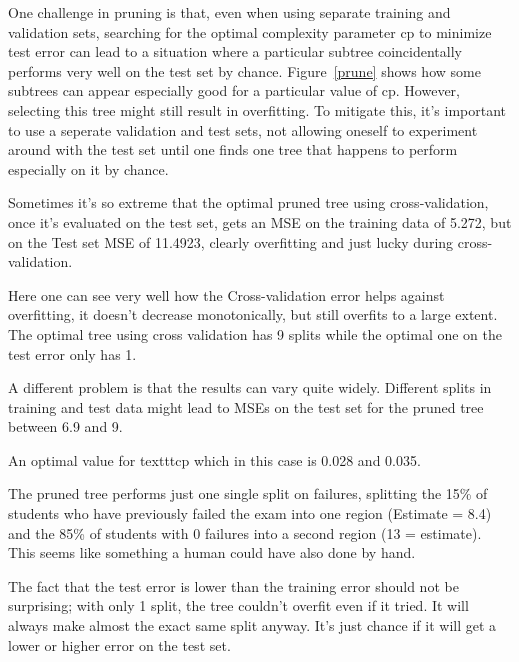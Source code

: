 \documentclass[12pt]{article}
\begin{document}
One challenge in pruning is that, even when using separate training and validation sets, searching for the optimal complexity parameter \( \text{cp} \) to minimize test error can lead to a situation where a particular subtree coincidentally performs very well on the test set by chance. Figure~\ref{prune} shows how some subtrees can appear especially good for a particular value of \( \text{cp} \). However, selecting this tree might still result in overfitting. To mitigate this, it's important to use a seperate validation and test sets, not allowing oneself to experiment around with the test set until one finds one tree that happens to perform especially on it by chance.






Sometimes it's so extreme that the optimal pruned tree using cross-validation, once it's evaluated on the test set, gets an MSE on the training data of 5.272, but on the Test set MSE of 11.4923, clearly overfitting and just lucky during cross-validation.

Here one can see very well how the Cross-validation error helps against overfitting, it doesn't decrease monotonically, but still overfits to a large extent. The optimal tree using cross validation has 9 splits while the optimal one on the test error only has 1.


A different problem is that the results can vary quite widely. Different splits in training and test data might lead to MSEs on the test set for the pruned tree between 6.9 and 9.

An optimal value for texttt{cp} which in this case is 0.028 and 0.035.







The pruned tree performs just one single split on failures, splitting the 15\% of students who have previously failed the exam into one region (Estimate = 8.4) and the 85\% of students with 0 failures into a second region (13 = estimate). This seems like something a human could have also done by hand.

The fact that the test error is lower than the training error should not be surprising; with only 1 split, the tree couldn't overfit even if it tried. It will always make almost the exact same split anyway. It's just chance if it will get a lower or higher error on the test set.
\end{document}

